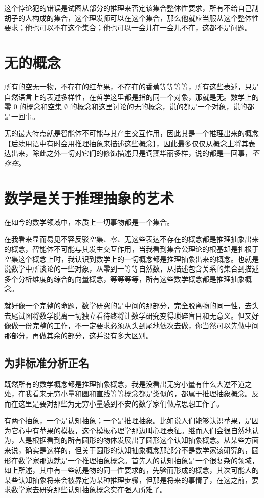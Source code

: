 \documentclass[12pt,oneside]{book}
\begin{document}
这个悖论犯的错误是试图从部分的推理来否定该集合整体性要求，所有不给自己刮胡子的人构成的集合，这个理发师可以在这个集合，那么他就应当服从这个整体性要求；他也可以不在这个集合；他也可以一会儿在一会儿不在，这都不是问题。

\section{无的概念}
所有的空无一物，不存在的红苹果，不存在的香蕉等等等等，所有这些表述，只是自然语言上的表述多样性，在哲学这里都是指的同一个对象，那就是\textbf{无}。数学上的零 $0$ 的概念和空集 $\emptyset$ 的概念和这里讨论的无的概念，说的都是一个对象，说的都是一回事。

无的最大特点就是智能体不可能与其产生交互作用，因此其是一个推理出来的概念【后续用语中有时会用推理抽象来描述这些概念】，因此最多仅仅从概念上将其表达出来，除此之外一切对它们的修饰描述只是词藻华丽多样，说的都是一回事，\textit{不存在}。

\section{数学是关于推理抽象的艺术}
\begin{bookref}[frametitle={\cite{Elements of Set Theory}}]
在如今的数学领域中，本质上一切事物都是一个集合。
\end{bookref}

在我看来显而易见不容反驳空集、零、无这些表达不存在的概念都是推理抽象出来的概念，智能体不可能与其发生交互作用，当我看到集合公理论的根基却是扎根于空集这个概念上时，我认识到数学上的一切概念都是推理抽象出来的概念。也就是说数学中所谈论的一些对象，从零到一等等自然数，从描述包含关系的集合到描述多个分析维度的综合的向量概念，等等等等，所有这些数学概念都是推理抽象概念。

就好像一个完整的命题，数学研究的是中间的那部分，完全脱离物的同一性，去头去尾试图将数学脱离一切独立看待终将让数学研究变得琐碎盲目和无意义。但又好像做一份完整的工作，不一定要求必须从头到尾地依次去做，你当然可以先做中间那部分，再做其余的部分，这并没有多大区别。


\subsection{为非标准分析正名}
既然所有的数学概念都是推理抽象概念，我是没看出无穷小量有什么大逆不道之处，在我看来无穷小量和圆和直线等等概念都是类似的，都属于推理抽象概念。反而在这里是要对那些为无穷小量感到不安的数学家们做点思想工作了。

有两个抽象，一个是认知抽象；一个是推理抽象。比如说人们能够认识苹果，是因为它心中有苹果的模板，这个模板心理学那边叫心理表征。继而人们会很自然地认为，人是根据看到的所有圆形的物体发展出了圆形这个认知抽象概念。从某些方面来说，确实是这样的，但关于圆形的认知抽象概念那部分不是数学家该研究的，圆形在数学家那边就是一个推理抽象概念。首先人的认知抽象是一个很复杂的领域，如上所述，其中有一些就是物的同一性要求的，先验而形成的概念，其次可能人的某些认知抽象将来会被界定为某种推理步骤，但那是将来的事情了，在这之前，要求数学家去研究那些认知抽象概念实在强人所难了。
\end{document}
